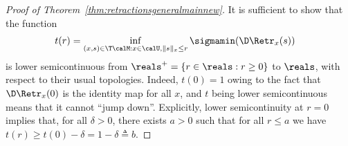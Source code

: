 \begin{proof}[Proof of Theorem~\ref{thm:retractionsgeneralmainnew}]
	It is sufficient to show that the function
	\begin{align}
	t(r) & = \inf_{(x, s) \in \T\calM : x \in \calU, \|s\|_x \leq r} \sigmamin(\D\Retr_x(s))
	\end{align}
	is lower semicontinuous from $\reals^+ = \{r \in \reals : r \geq 0 \}$ to $\reals$, with respect to their usual topologies. Indeed, $t(0) = 1$ owing to the fact that $\D\Retr_x(0)$ is the identity map for all $x$, and $t$ being lower semicontinuous means that it cannot ``jump down''. Explicitly, lower semicontinuity at $r = 0$ implies that, for all $\delta > 0$, there exists $a > 0$ such that for all $r \leq a$ we have $t(r) \geq t(0) - \delta = 1 - \delta \triangleq b$. %
	

\end{proof}
